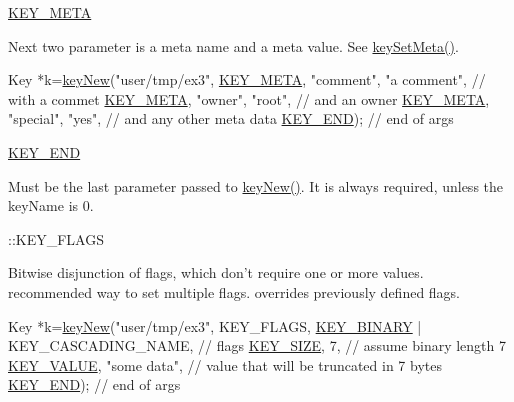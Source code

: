 \begin{DoxyItemize}
\item \hyperlink{group__key_gga91fb3178848bd682000958089abbaf40a040582834bb2d90049947d7ef74e87e2}{K\-E\-Y\-\_\-\-M\-E\-T\-A} \par
 Next two parameter is a meta name and a meta value. See \hyperlink{group__keymeta_gae1f15546b234ffb6007d8a31178652b9}{key\-Set\-Meta()}. 
\begin{DoxyCodeInclude}
Key *k=\hyperlink{group__key_gad23c65b44bf48d773759e1f9a4d43b89}{keyNew}(\textcolor{stringliteral}{"user/tmp/ex3"},
        \hyperlink{group__key_gga91fb3178848bd682000958089abbaf40a040582834bb2d90049947d7ef74e87e2}{KEY\_META}, \textcolor{stringliteral}{"comment"}, \textcolor{stringliteral}{"a comment"},  \textcolor{comment}{// with a commet}
        \hyperlink{group__key_gga91fb3178848bd682000958089abbaf40a040582834bb2d90049947d7ef74e87e2}{KEY\_META}, \textcolor{stringliteral}{"owner"}, \textcolor{stringliteral}{"root"},         \textcolor{comment}{// and an owner}
        \hyperlink{group__key_gga91fb3178848bd682000958089abbaf40a040582834bb2d90049947d7ef74e87e2}{KEY\_META}, \textcolor{stringliteral}{"special"}, \textcolor{stringliteral}{"yes"},        \textcolor{comment}{// and any other meta data}
        \hyperlink{group__key_gga91fb3178848bd682000958089abbaf40aa8adb6fcb92dec58fb19410eacfdd403}{KEY\_END});                  \textcolor{comment}{// end of args}
\end{DoxyCodeInclude}

\item \hyperlink{group__key_gga91fb3178848bd682000958089abbaf40aa8adb6fcb92dec58fb19410eacfdd403}{K\-E\-Y\-\_\-\-E\-N\-D} \par
 Must be the last parameter passed to \hyperlink{group__key_gad23c65b44bf48d773759e1f9a4d43b89}{key\-New()}. It is always required, unless the {\ttfamily key\-Name} is 0.
\item \-::\-K\-E\-Y\-\_\-\-F\-L\-A\-G\-S \par
 Bitwise disjunction of flags, which don't require one or more values. recommended way to set multiple flags. overrides previously defined flags. 
\begin{DoxyCodeInclude}
Key *k=\hyperlink{group__key_gad23c65b44bf48d773759e1f9a4d43b89}{keyNew}(\textcolor{stringliteral}{"user/tmp/ex3"},
        KEY\_FLAGS, \hyperlink{group__key_gga91fb3178848bd682000958089abbaf40a1ca18d4e094ae7487d35ecedda2235ff}{KEY\_BINARY} | KEY\_CASCADING\_NAME, \textcolor{comment}{// flags}
        \hyperlink{group__key_gga91fb3178848bd682000958089abbaf40a6d531b5c41445d19d0452eebdccbfa01}{KEY\_SIZE}, 7,                    \textcolor{comment}{// assume binary length 7}
        \hyperlink{group__key_gga91fb3178848bd682000958089abbaf40ac66e4a49d09212b79f5754ca6db5bd2e}{KEY\_VALUE}, \textcolor{stringliteral}{"some data"},                \textcolor{comment}{// value that will be
       truncated in 7 bytes}
        \hyperlink{group__key_gga91fb3178848bd682000958089abbaf40aa8adb6fcb92dec58fb19410eacfdd403}{KEY\_END});                        \textcolor{comment}{// end of args}
\end{DoxyCodeInclude}


\end{DoxyItemize}
